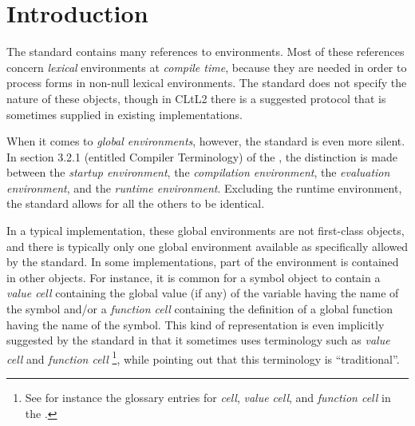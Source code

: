 \section{Introduction}

The \commonlisp{} standard contains many references to environments.
Most of these references concern \emph{lexical} environments at
\emph{compile time}, because they are needed in order to process forms
in non-null lexical environments.  The standard does not specify the
nature of these objects, though in CLtL2 \cite{Steele:1990:CLL:95411}
there is a suggested protocol that is sometimes supplied in existing
\commonlisp{} implementations. 

When it comes to \emph{global environments}, however, the standard is
even more silent.  In section 3.2.1 (entitled Compiler Terminology) of
the \commonlisp{} \hs{}, the distinction is made between the
\emph{startup environment}, the \emph{compilation environment}, the
\emph{evaluation environment}, and the \emph{runtime environment}.
Excluding the runtime environment, the standard allows for all the
others to be identical.

In a typical \commonlisp{} implementation, these global environments
are not first-class objects, and there is typically only one global
environment available as specifically allowed by the standard.  In some
implementations, part of the environment is contained in other
objects.  For instance, it is common for a symbol object to contain a
\emph{value cell} containing the global value (if any) of the variable
having the name of the symbol and/or a \emph{function cell} containing
the definition of a global function having the name of the symbol.
This kind of representation is even implicitly suggested by the
standard in that it sometimes uses terminology such as \emph{value
  cell} and \emph{function cell}%
\footnote{See for instance the glossary entries for \emph{cell},
  \emph{value cell}, and \emph{function cell} in the
  \hs{}.},  while pointing out that this terminology is ``traditional''.

